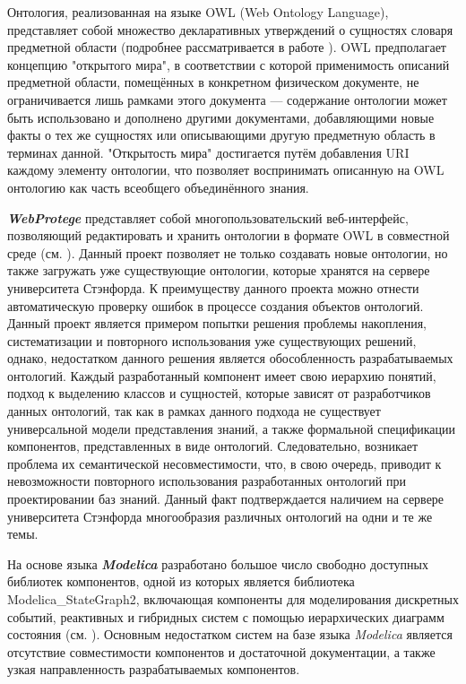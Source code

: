 Онтология, реализованная на языке OWL (Web Ontology Language), представляет собой множество декларативных утверждений о сущностях словаря предметной области (подробнее рассматривается в работе ). OWL предполагает концепцию "открытого мира"{}, в соответствии с которой применимость описаний предметной области, помещённых в конкретном физическом документе, не ограничивается лишь рамками этого документа --- содержание онтологии может быть использовано и дополнено другими документами, добавляющими новые факты о тех же сущностях или описывающими другую предметную область в терминах данной. "Открытость мира"{} достигается путём добавления URI каждому элементу онтологии, что позволяет воспринимать описанную на OWL онтологию как часть всеобщего объединённого знания.

\textbf{\textit{WebProtege}} представляет собой многопользовательский веб-интерфейс, позволяющий редактировать и хранить онтологии в формате OWL в совместной среде (см. ). Данный проект позволяет не только создавать новые онтологии, но также загружать уже существующие онтологии, которые хранятся на сервере университета Стэнфорда. К преимуществу данного проекта можно отнести автоматическую проверку ошибок в процессе создания объектов онтологий. Данный проект является примером попытки решения проблемы накопления, систематизации и повторного использования уже существующих решений, однако, недостатком данного решения является обособленность разрабатываемых онтологий. Каждый разработанный компонент имеет свою иерархию понятий, подход к выделению классов и сущностей, которые зависят от разработчиков данных онтологий, так как в рамках данного подхода не существует универсальной модели представления знаний, а также формальной спецификации компонентов, представленных в виде онтологий. Следовательно, возникает проблема их семантической несовместимости, что, в свою очередь, приводит к невозможности повторного использования разработанных онтологий при проектировании баз знаний. Данный факт подтверждается наличием на сервере университета Стэнфорда многообразия различных онтологий на одни и те же темы.

На основе языка \textbf{\textit{Modelica}} разработано большое число свободно доступных библиотек компонентов, одной из которых является библиотека Modelica\_StateGraph2, включающая компоненты для моделирования дискретных событий, реактивных и гибридных систем с помощью иерархических диаграмм состояния (см. ). Основным недостатком систем на базе языка \textit{Modelica} является отсутствие совместимости компонентов и достаточной документации, а также узкая направленность разрабатываемых компонентов.

